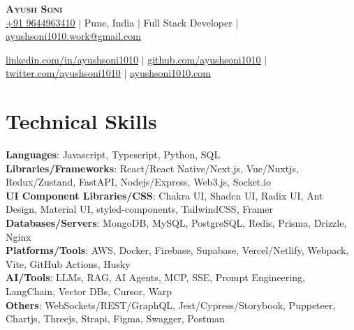 \documentclass[letterpaper,10pt]{article}
\begin{document}

\begin{center}
\textbf{\Huge \scshape Ayush Soni} \\ \vspace{10pt}
\href{tel:9644963410}{+91 9644963410} $|$
{Pune, India} $|$
{Full Stack Developer} $|$
\href{mailto:ayushsoni1010.work@gmail.com}{ayushsoni1010.work@gmail.com} \\ \vspace{3pt}

\href{https://linkedin.com/in/ayushsoni1010}{\underline{linkedin.com/in/ayushsoni1010}} $|$
\href{https://github.com/ayushsoni1010}{\underline{github.com/ayushsoni1010}} $|$
\href{https://twitter.com/ayushsoni1010}{\underline{twitter.com/ayushsoni1010}} $|$
\href{https://ayushsoni1010.com}{\underline{ayushsoni1010.com}}
\end{center}



\section{Technical Skills}
\begin{itemize}[leftmargin=0.15in, label={}]
\small{\item{
      \textbf{Languages}{: \hfill Javascript, Typescript, Python, SQL } \\
      \vspace{3pt}\textbf{Libraries/Frameworks}{: \hfill React/React Native/Next.js, Vue/Nuxtjs, Redux/Zustand, FastAPI, Nodejs/Express, Web3.js, Socket.io} \\
      \vspace{3pt}\textbf{UI Component Libraries/CSS}{: \hfill Chakra UI, Shadcn UI, Radix UI, Ant Design, Material UI, styled-components, TailwindCSS, Framer} \\
      \vspace{3pt}\textbf{Databases/Servers}{: \hfill MongoDB, MySQL, PostgreSQL, Redis, Prisma, Drizzle, Nginx} \\
      \vspace{3pt}\textbf{Platforms/Tools}{: \hfill AWS, Docker, Firebase, Supabase, Vercel/Netlify, Webpack, Vite, GitHub Actions, Husky} \\
      \vspace{3pt}\textbf{AI/Tools}{: \hfill LLMs, RAG, AI Agents, MCP, SSE, Prompt Engineering, LangChain, Vector DBs, Cursor, Warp} \\
      \vspace{3pt}\textbf{Others}{: \hfill WebSockets/REST/GraphQL, Jest/Cypress/Storybook, Puppeteer, Chartjs, Threejs, Strapi, Figma, Swagger, Postman}
      }}
\end{itemize}
\end{document}
